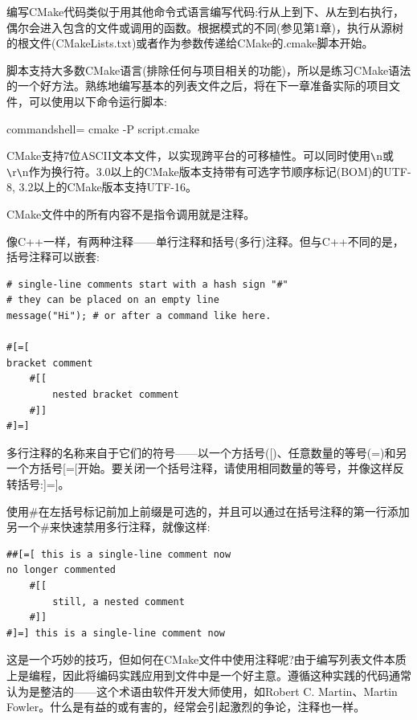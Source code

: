 
编写CMake代码类似于用其他命令式语言编写代码:行从上到下、从左到右执行，偶尔会进入包含的文件或调用的函数。根据模式的不同(参见第1章)，执行从源树的根文件(CMakeLists.txt)或者作为参数传递给CMake的.cmake脚本开始。

脚本支持大多数CMake语言(排除任何与项目相关的功能)，所以是练习CMake语法的一个好方法。熟练地编写基本的列表文件之后，将在下一章准备实际的项目文件，可以使用以下命令运行脚本:

\begin{tcblisting}{commandshell={}}
cmake -P script.cmake
\end{tcblisting}

\begin{tcolorbox}[colback=blue!5!white,colframe=blue!75!black,title=Note]
CMake支持7位ASCII文本文件，以实现跨平台的可移植性。可以同时使用\verb|\|n或\verb|\|r\verb|\|n作为换行符。3.0以上的CMake版本支持带有可选字节顺序标记(BOM)的UTF-8, 3.2以上的CMake版本支持UTF-16。
\end{tcolorbox}

CMake文件中的所有内容不是指令调用就是注释。


像C++一样，有两种注释——单行注释和括号(多行)注释。但与C++不同的是，括号注释可以嵌套:

\begin{lstlisting}[style=styleCMake]	
# single-line comments start with a hash sign "#"
# they can be placed on an empty line
message("Hi"); # or after a command like here.

#[=[
bracket comment
	#[[
		nested bracket comment
	#]]
#]=]
\end{lstlisting}

多行注释的名称来自于它们的符号——以一个方括号([)、任意数量的等号(=)和另一个方括号[=[开始。要关闭一个括号注释，请使用相同数量的等号，并像这样反转括号:]=]。

使用\#在左括号标记前加上前缀是可选的，并且可以通过在括号注释的第一行添加另一个\#来快速禁用多行注释，就像这样:

\begin{lstlisting}[style=styleCMake]	
##[=[ this is a single-line comment now
no longer commented
	#[[
		still, a nested comment
	#]]
#]=] this is a single-line comment now
\end{lstlisting}

这是一个巧妙的技巧，但如何在CMake文件中使用注释呢?由于编写列表文件本质上是编程，因此将编码实践应用到文件中是一个好主意。遵循这种实践的代码通常认为是整洁的——这个术语由软件开发大师使用，如Robert C. Martin、Martin Fowler。什么是有益的或有害的，经常会引起激烈的争论，注释也一样。

